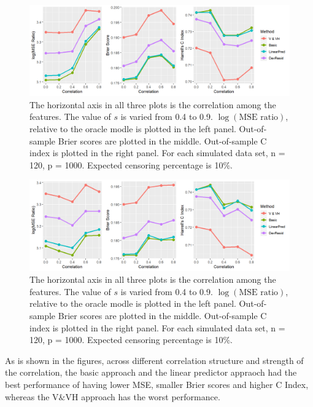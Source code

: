 \documentclass{article}
\begin{document}
\begin{figure}[ht]
  \centering
  \includegraphics[width=\textwidth]{manuscript_figure/figure_2_ex.png}
  \caption{\label{Fig:ex} The horizontal axis in all three plots is the correlation among the features. The value of $s$ is varied from 0.4 to 0.9.  $\log(\text{MSE ratio})$, relative to the oracle modle is plotted in the left panel. Out-of-sample Brier scores are plotted in the middle. Out-of-sample C index is plotted in the right panel. For each simulated data set, n = 120, p = 1000. Expected censoring percentage is 10$\%$.}
\end{figure}	

\begin{figure}[ht]
  \centering
  \includegraphics[width=\textwidth]{manuscript_figure/figure_2_auto.png}
  \caption{\label{Fig:auto} The horizontal axis in all three plots is the correlation among the features. The value of $s$ is varied from 0.4 to 0.9.  $\log(\text{MSE ratio})$, relative to the oracle modle is plotted in the left panel. Out-of-sample Brier scores are plotted in the middle. Out-of-sample C index is plotted in the right panel. For each simulated data set, n = 120, p = 1000. Expected censoring percentage is 10$\%$.}
\end{figure}	

As is shown in the figures, across different correlation structure and strength of the correlation, the basic approach and the linear predictor appraoch had the best performance of having lower MSE, smaller Brier scores and higher C Index, whereas the V$\&$VH approach has the worst performance.



\end{document}
